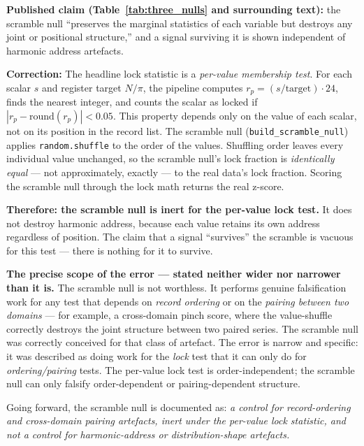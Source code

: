 \documentclass[11pt, letterpaper, openany]{book}
\begin{document}
\begin{warningbox}
\textbf{Published claim (Table~\ref{tab:three_nulls} and surrounding text):} the
scramble null ``preserves the marginal statistics of each variable but destroys any
joint or positional structure,'' and a signal surviving it is shown independent of
harmonic address artefacts.
 
\textbf{Correction:} The headline lock statistic is a \emph{per-value membership
test}. For each scalar $s$ and register target $N/\pi$, the pipeline computes
$r_p = (s/\text{target})\cdot 24$, finds the nearest integer, and counts the scalar
as locked if $|r_p - \text{round}(r_p)| < 0.05$. This property depends only on the
value of each scalar, not on its position in the record list. The scramble null
(\texttt{build\_scramble\_null}) applies \texttt{random.shuffle} to the order of the
values. Shuffling order leaves every individual value unchanged, so the scramble
null's lock fraction is \emph{identically equal} --- not approximately, exactly ---
to the real data's lock fraction. Scoring the scramble null through the lock math
returns the real z-score.
 
\textbf{Therefore: the scramble null is inert for the per-value lock test.} It does
not destroy harmonic address, because each value retains its own address regardless
of position. The claim that a signal ``survives'' the scramble is vacuous for this
test --- there is nothing for it to survive.
\end{warningbox}
 
\begin{empiricalbox}
\textbf{The precise scope of the error --- stated neither wider nor narrower than
it is.} The scramble null is not worthless. It performs genuine falsification work
for any test that depends on \emph{record ordering} or on the \emph{pairing between
two domains} --- for example, a cross-domain pinch score, where the value-shuffle
correctly destroys the joint structure between two paired series. The scramble null
was correctly conceived for that class of artefact. The error is narrow and specific:
it was described as doing work for the \emph{lock} test that it can only do for
\emph{ordering/pairing} tests. The per-value lock test is order-independent; the
scramble null can only falsify order-dependent or pairing-dependent structure.
 
Going forward, the scramble null is documented as: \textit{a control for
record-ordering and cross-domain pairing artefacts, inert under the per-value lock
statistic, and not a control for harmonic-address or distribution-shape artefacts.}
\end{empiricalbox}
 
\end{document}
